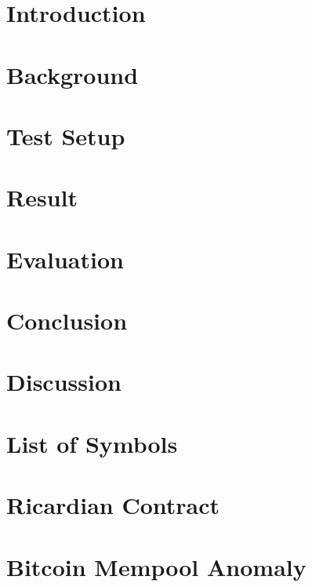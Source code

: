 \documentclass[Nomencl]{DylanMaster}
\begin{document}
\mytitlepage

\newpage

\tableofcontents

\newpage
\section{Introduction}


\newpage
\section{Background}


\newpage
\section{Test Setup}


\newpage
\section{Result}


\newpage
\section{Evaluation}


\newpage
\section{Conclusion}


\newpage
\section{Discussion}


\newpage
\appendix
\section{List of Symbols}


\newpage
\section{Ricardian Contract}


\newpage
\section{Bitcoin Mempool Anomaly}


\newpage


\end{document}
